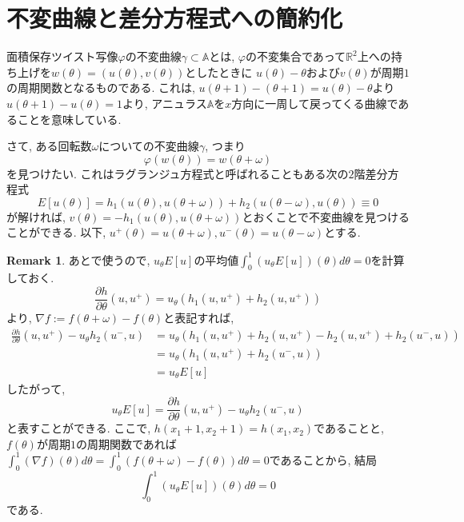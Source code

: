 \documentclass[a4paper]{ujarticle}
\numberwithin{equation}{section}
\theoremstyle{definition}
\newtheorem{remark}{Remark}
\begin{document}
    \section{不変曲線と差分方程式への簡約化}
        面積保存ツイスト写像$\varphi$の不変曲線$\gamma \subset \mathbb{A}$とは, 
        $\varphi$の不変集合であって$\mathbb{R}^2$上への持ち上げを$w(\theta) = (u(\theta), v(\theta))$としたときに
        $u(\theta) - \theta$および$v(\theta)$が周期$1$の周期関数となるものである.
        これは, $u(\theta + 1) - (\theta + 1) = u(\theta) - \theta$より$u(\theta + 1) - u(\theta) = 1$より, 
        アニュラス$\mathbb{A}$を$x$方向に一周して戻ってくる曲線であることを意味している.
        
        さて, ある回転数$\omega$についての不変曲線$\gamma$, つまり
        \[
                \varphi(w(\theta)) = w(\theta + \omega)
        \]
        を見つけたい. これはラグランジュ方程式と呼ばれることもある次の$2$階差分方程式
        \begin{equation} \label{eq:3}
            E[u(\theta)] = h_1(u(\theta), u(\theta + \omega)) + h_2(u(\theta - \omega), u(\theta)) \equiv 0
        \end{equation}
        が解ければ, $v(\theta) = - h_1(u(\theta), u(\theta + \omega))$とおくことで不変曲線を見つけることができる.
        以下, $u^{+}(\theta) = u(\theta + \omega), u^{-}(\theta) = u(\theta - \omega)$とする.

        \begin{remark}
            あとで使うので, $u_{\theta} E[u]$の平均値$\displaystyle \int^{1}_{0} (u_{\theta} E[u])(\theta) d \theta = 0$を計算しておく.
            \[
                \frac{\partial h}{\partial \theta}(u, u^{+}) = u_{\theta} (h_1(u, u^{+}) + h_2(u, u^{+}))
            \]
            より, $\nabla f := f(\theta + \omega) - f(\theta)$と表記すれば,
            \begin{align}
                \frac{\partial h}{\partial \theta}(u, u^{+}) - u_{\theta} h_2(u^{-}, u)
                &= u_{\theta} (h_1(u, u^{+}) + h_2(u, u^{+}) - h_2(u, u^{+}) + h_2(u^{-}, u)) \\
                &= u_{\theta} (h_1(u, u^{+}) + h_2(u^{-}, u)) \\
                &= u_{\theta} E[u]
            \end{align}
            したがって, 
            \[
                u_{\theta} E[u] = \frac{\partial h}{\partial \theta}(u, u^{+}) - u_{\theta} h_2(u^{-}, u)
            \]
            と表すことができる.
            ここで, $h(x_1+1, x_2 + 1) = h(x_1, x_2)$であることと, 
            $f(\theta)$が周期$1$の周期関数であれば$\displaystyle \int^{1}_{0} (\nabla f)(\theta) d \theta = \int^{1}_{0} (f(\theta + \omega) - f(\theta)) d \theta = 0$であることから,
            結局
            \[
                \int^{1}_{0} (u_{\theta} E[u])(\theta) d \theta = 0
            \]
            である.

        \end{remark}
\end{document}
